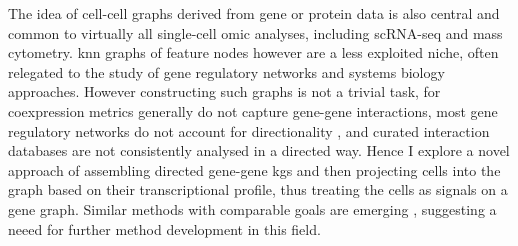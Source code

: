 The idea of cell-cell graphs derived from gene or protein data is also central and common to virtually all single-cell omic analyses, including scRNA-seq and mass cytometry. \acrshort{knn} graphs of feature nodes however are a less exploited niche, often relegated to the study of gene regulatory networks and systems biology approaches. However constructing such graphs is not a trivial task, for coexpression metrics generally do not capture gene-gene interactions, most gene regulatory networks do not account for directionality \cite{chen_inferring_2019}, and curated interaction databases \cite{turei_integrated_2021} are not consistently analysed in a directed way. Hence I explore a novel approach of assembling directed gene-gene \acrfull{kg}s and then projecting cells into the graph based on their transcriptional profile, thus treating the cells as signals on a gene graph. Similar methods with comparable goals are emerging \cite{lefebvre_large-scale_2021}, suggesting a neeed for further method development in this field.


    
    
